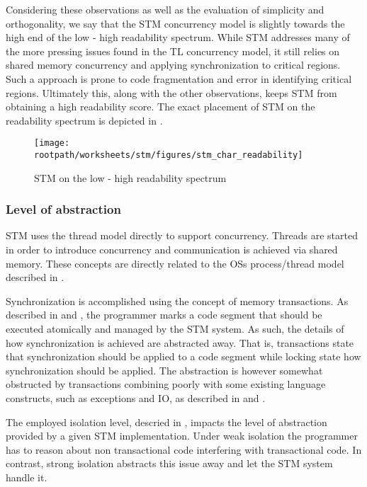 Considering these observations as well as the evaluation of simplicity and orthogonality, we say that the \ac{STM} concurrency model is slightly towards the high end of the low - high readability spectrum. While \ac{STM} addresses many of the more pressing issues found in the \ac{TL} concurrency model, it still relies on shared memory concurrency and applying synchronization to critical regions. Such a approach is prone to code fragmentation and error in identifying critical regions. Ultimately this, along with the other observations, keeps \ac{STM} from obtaining a high readability score. The exact placement of \ac{STM} on the readability spectrum is depicted in .

\begin{figure}[htbp]
\centering
 \texttt{[image: \\rootpath/worksheets/stm/figures/stm\_char\_readability]} 
 \caption{\ac{STM} on the low - high readability spectrum}
\label{fig:char_stm_readability}
\end{figure}

\subsubsection{Level of abstraction}\label{sec:stm_level_of_abstraction}
\ac{STM} uses the thread model directly to support concurrency. Threads are started in order to introduce concurrency and communication is achieved via shared memory. These concepts are directly related to the \acp{OS} process/thread model described in .

Synchronization is accomplished using the concept of memory transactions. As described in  and , the programmer marks a code segment that should be executed atomically and managed by the \ac{STM} system. As such, the details of how synchronization is achieved are abstracted away. That is, transactions state that synchronization should be applied to a code segment while locking state how synchronization should be applied. The abstraction is however somewhat obstructed by transactions combining poorly with some existing language constructs, such as exceptions and \ac{IO}, as described in  and .

The employed isolation level, descried in , impacts the level of abstraction provided by a given \ac{STM} implementation. Under weak isolation the programmer has to reason about non transactional code interfering with transactional code. In contrast, strong isolation abstracts this issue away and let the \ac{STM} system handle it.

